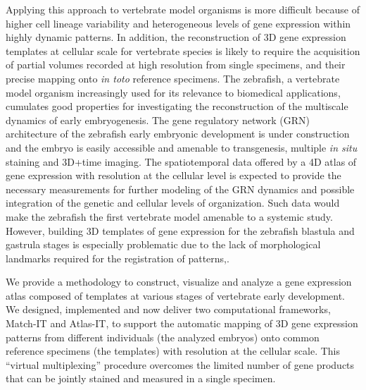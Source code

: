 Applying this approach to vertebrate model organisms is more difficult because of higher cell lineage variability and heterogeneous levels of gene expression within highly dynamic patterns. In addition, the reconstruction of 3D gene expression templates at cellular scale for vertebrate species is likely to require the acquisition of partial volumes recorded at high resolution\cite{peng2011brainaligner} from single specimens, and their precise mapping onto \emph{in toto} reference specimens. The zebrafish, a vertebrate model organism increasingly used for its relevance to biomedical applications\cite{stern2003cancer}, cumulates good properties for investigating the reconstruction of the multiscale dynamics of early embryogenesis. The gene regulatory network (GRN) architecture of the zebrafish early embryonic development is under construction\cite{chan2009developmental} and the embryo is easily accessible and amenable to transgenesis, multiple \emph{in situ} staining and 3D+time imaging. The spatiotemporal data offered by a 4D atlas of gene expression with resolution at the cellular level is expected to provide the necessary measurements for further modeling of the GRN dynamics and possible integration of the genetic and cellular levels of organization\cite{crombach2012efficient}. Such data would make the zebrafish the first vertebrate model amenable to a systemic study. However, building 3D templates of gene expression for the zebrafish blastula and gastrula stages is especially problematic due to the lack of morphological landmarks required for the registration of patterns\cite{fowlkes2011conserved},\cite{ronneberger2012vibe}.



We provide a methodology to construct, visualize and analyze a gene expression atlas composed of templates at various stages of vertebrate early development. We designed, implemented and now deliver two computational frameworks, Match-IT and Atlas-IT, to support the automatic mapping of 3D gene expression patterns from different individuals (the analyzed embryos) onto common reference specimens (the templates) with resolution at the cellular scale. This ``virtual multiplexing'' procedure\cite{fowlkes2008quantitative} overcomes the limited number of gene products that can be jointly stained and measured in a single specimen.



